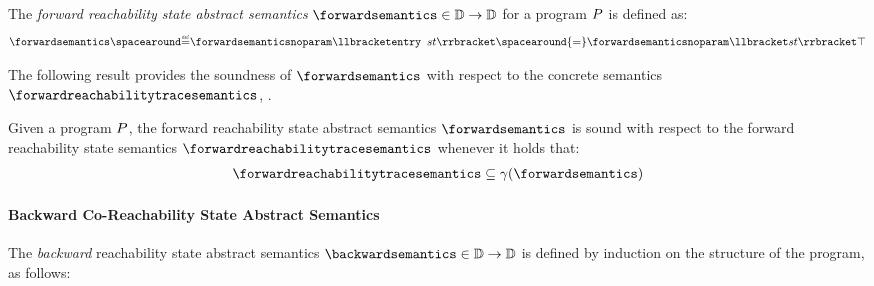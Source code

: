 \begin{description}
    \begin{definition}
      The \emph{forward reachability state abstract semantics} $\forwardsemantics\in\forwardtype$ for a program $P$ is defined as:
      \begin{align*}
        \forwardsemantics \DefeQ \forwardsemanticsnoparam \semanticsof{\progstmt} \spacearound{=} \forwardsemanticsnoparam \semanticsof{\defstmt}\abstractdomaintop
      \end{align*}
    \end{definition}
\end{description}

The following result provides the soundness of $\forwardsemantics$ with respect to the concrete semantics $\forwardreachabilitytracesemantics$, \cf{} .

\begin{theorem}
  Given a program $P$, the forward reachability state abstract semantics $\forwardsemantics$ is sound with respect to the forward reachability state semantics $\forwardreachabilitytracesemantics$ whenever it holds that:
  \begin{align*}
    \forwardreachabilitytracesemantics \subseteq \abstractdomainconcretization(\forwardsemantics)
  \end{align*}
\end{theorem}

\paragraph{Backward Co-Reachability State Abstract Semantics}

The \emph{backward} reachability state abstract semantics $\backwardsemantics\in\backwardtype$ is defined by induction on the structure of the program, as follows:

